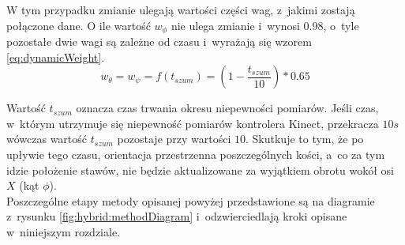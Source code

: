 W tym przypadku zmianie ulegają wartości części wag, z~jakimi zostają połączone dane. O ile wartość $w_\phi$ nie ulega zmianie i~wynosi $0.98$, o~tyle pozostałe dwie wagi są zależne od czasu i~wyrażają się wzorem \ref{eq:dynamicWeight}.
\begin{equation}
	w_{\theta} = w_{\psi} = f(t_{szum}) = (1-\frac{t_{szum}}{10}) * 0.65
	\label{eq:dynamicWeight}
\end{equation}

Wartość $t_{szum}$ oznacza czas trwania okresu niepewności pomiarów. Jeśli czas, w~którym utrzymuje się niepewność pomiarów kontrolera Kinect, przekracza $10s$ wówczas wartość $t_{szum}$ pozostaje przy wartości $10$. Skutkuje to tym, że po upływie tego czasu, orientacja przestrzenna poszczególnych kości, a~co za tym idzie położenie stawów, nie będzie aktualizowane za wyjątkiem obrotu wokół osi $X$ (kąt $\phi$). \\


Poszczególne etapy metody opisanej powyżej przedstawione są na diagramie z~rysunku \ref{fig:hybrid:methodDiagram} i~odzwierciedlają kroki opisane w~niniejszym rozdziale.